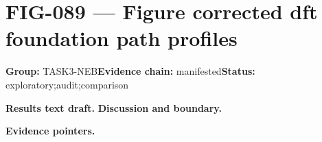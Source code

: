 \clearpage
\section{FIG-089 --- Figure corrected dft foundation path profiles}
\label{figpage:fig-089}
\textbf{Group:} TASK3-NEB\quad \textbf{Evidence chain:} manifested\quad \textbf{Status:} exploratory;audit;comparison

\textbf{Results text draft.} 
\textbf{Discussion and boundary.} 


\textbf{Evidence pointers.}



\vfill
